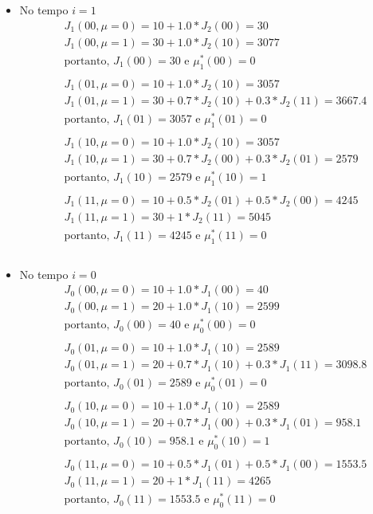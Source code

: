 \documentclass[12pt]{article}
\begin{document}
\begin{itemize}
  \item{No tempo $i = 1$}
  \begin{align*}
    &J_1 (00, \mu = 0) = 10 + 1.0 * J_2 (00) = 30 \\
    &J_1 (00, \mu = 1) = 30 + 1.0 * J_2 (10) = 3077 \\
    &\text{portanto, } J_1 (00) = 30 \text{ e } \mu_1^* (00) = 0\\
    &\\
    &J_1 (01, \mu = 0) = 10 + 1.0 * J_2 (10) = 3057 \\
    &J_1 (01, \mu = 1) = 30 + 0.7 * J_2 (10) + 0.3 * J_2 (11) = 3667.4 \\
    &\text{portanto, } J_1 (01) = 3057 \text{ e } \mu_1^* (01) = 0\\
    &\\
    &J_1 (10, \mu = 0) = 10 + 1.0 * J_2 (10) = 3057 \\
    &J_1 (10, \mu = 1) = 30 + 0.7 * J_2 (00) + 0.3 * J_2 (01) = 2579 \\
    &\text{portanto, } J_1 (10) = 2579 \text{ e } \mu_1^* (10) = 1\\
    &\\
    &J_1 (11, \mu = 0) = 10 + 0.5 * J_2 (01) + 0.5 * J_2 (00) = 4245 \\
    &J_1 (11, \mu = 1) = 30 + 1 * J_2 (11) =  5045 \\
    &\text{portanto, } J_1 (11) = 4245 \text{ e } \mu_1^* (11) = 0\\
    &\\
  \end{align*}
  
\item{No tempo $i = 0$}
  \begin{align*}
    &J_0 (00, \mu = 0) = 10 + 1.0 * J_1 (00) = 40 \\
    &J_0 (00, \mu = 1) = 20 + 1.0 * J_1 (10) = 2599 \\
    &\text{portanto, } J_0 (00) = 40 \text{ e } \mu_0^* (00) = 0\\
    &\\
    &J_0 (01, \mu = 0) = 10 + 1.0 * J_1 (10) = 2589 \\
    &J_0 (01, \mu = 1) = 20 + 0.7 * J_1 (10) + 0.3 * J_1 (11) = 3098.8 \\
    &\text{portanto, } J_0 (01) = 2589 \text{ e } \mu_0^* (01) = 0\\
    &\\
    &J_0 (10, \mu = 0) = 10 + 1.0 * J_1 (10) = 2589 \\
    &J_0 (10, \mu = 1) = 20 + 0.7 * J_1 (00) + 0.3 * J_1 (01) = 958.1 \\
    &\text{portanto, } J_0 (10) = 958.1 \text{ e } \mu_0^* (10) = 1\\
    &\\
    &J_0 (11, \mu = 0) = 10 + 0.5 * J_1 (01) + 0.5 * J_1 (00) = 1553.5 \\
    &J_0 (11, \mu = 1) = 20 + 1 * J_1 (11) =  4265 \\
    &\text{portanto, } J_0 (11) = 1553.5 \text{ e } \mu_0^* (11) = 0\\
    &\\
  \end{align*}
\end{itemize}
\end{document}
